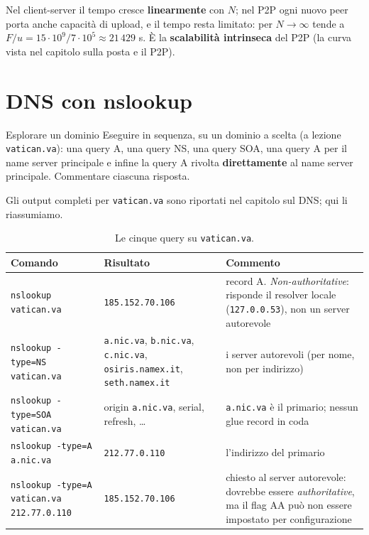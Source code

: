 Nel client-server il tempo cresce \textbf{linearmente} con $N$; nel P2P ogni nuovo peer porta anche capacità di upload, e il
tempo resta limitato: per $N \to \infty$ tende a $F/u = 15 \cdot 10^9 / 7 \cdot 10^5 \approx 21\,429$ s. È la
\textbf{scalabilità intrinseca} del P2P (la curva vista nel capitolo sulla posta e il P2P).

\section{DNS con nslookup}

\begin{esercizio}{Esplorare un dominio}
Eseguire in sequenza, su un dominio a scelta (a lezione \texttt{vatican.va}): una query A, una query NS, una query SOA, una
query A per il name server principale e infine la query A rivolta \textbf{direttamente} al name server principale. Commentare
ciascuna risposta.
\end{esercizio}

\svolgimento
Gli output completi per \texttt{vatican.va} sono riportati nel capitolo sul DNS; qui li riassumiamo.

\begin{table}[H]
\centering
\small
\begin{tabular}{p{4.6cm}p{4.6cm}p{5.4cm}}
\toprule
\textbf{Comando} & \textbf{Risultato} & \textbf{Commento} \\
\midrule
\texttt{nslookup vatican.va} & \texttt{185.152.70.106} & record A. \emph{Non-authoritative}: risponde il resolver locale (\texttt{127.0.0.53}), non un server autorevole \\
\texttt{nslookup -type=NS vatican.va} & \texttt{a.nic.va}, \texttt{b.nic.va}, \texttt{c.nic.va}, \texttt{osiris.namex.it}, \texttt{seth.namex.it} & i server autorevoli (per nome, non per indirizzo) \\
\texttt{nslookup -type=SOA vatican.va} & origin \texttt{a.nic.va}, serial, refresh, \dots & \texttt{a.nic.va} è il primario; nessun glue record in coda \\
\texttt{nslookup -type=A a.nic.va} & \texttt{212.77.0.110} & l'indirizzo del primario \\
\texttt{nslookup -type=A vatican.va 212.77.0.110} & \texttt{185.152.70.106} & chiesto al server autorevole: dovrebbe essere \emph{authoritative}, ma il flag AA può non essere impostato per configurazione \\
\bottomrule
\end{tabular}
\caption{Le cinque query su \texttt{vatican.va}.}
\end{table}

